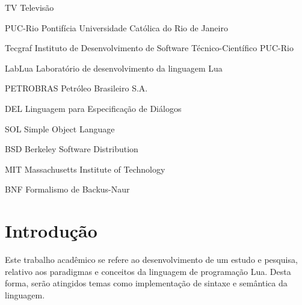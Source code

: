 \documentclass[
12pt, %
openright, %
oneside, %
a4paper, %
english, %
brazil, %
]{abntex2}
\begin{document}
\listoffigures*
\cleardoublepage

\listoftables*
\cleardoublepage

\begin{siglas}
  \item[TV] Televisão 
  \item[PUC-Rio] Pontifícia Universidade Católica do Rio de Janeiro
  \item[Tecgraf] Instituto de Desenvolvimento de Software Técnico-Científico PUC-Rio
  \item[LabLua] Laboratório de desenvolvimento da linguagem Lua
  \item[PETROBRAS]  Petróleo Brasileiro S.A. 
  \item[DEL] Linguagem para Especificação de Diálogos 
  \item[SOL] Simple Object Language
  \item[BSD] Berkeley Software Distribution 
  \item[MIT] Massachusetts Institute of Technology
  \item[BNF] Formalismo de Backus-Naur
\end{siglas}


\tableofcontents*
\cleardoublepage

\textual

\chapter{Introdução}
Este trabalho acadêmico se refere ao desenvolvimento de um estudo e pesquisa, relativo aos paradigmas e conceitos da linguagem de programação Lua. Desta forma, serão atingidos temas como implementação de sintaxe e semântica da linguagem.
\end{document}
